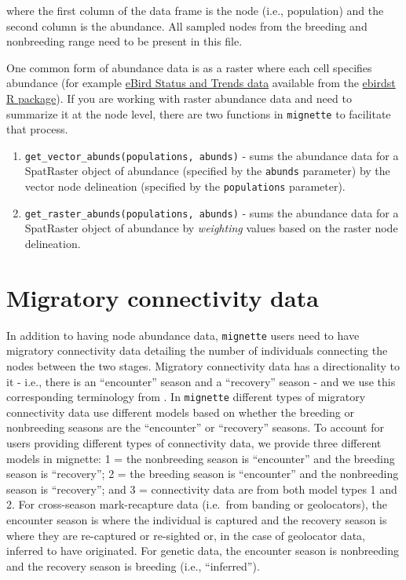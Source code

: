 \documentclass[
]{book}
\begin{document}
where the first column of the data frame is the node (i.e., population) and the second column is the abundance. All sampled nodes from the breeding and nonbreeding range need to be present in this file.

One common form of abundance data is as a raster where each cell specifies abundance (for example \href{https://science.ebird.org/en/status-and-trends}{eBird Status and Trends data} available from the \href{https://cornelllabofornithology.github.io/ebirdst/}{ebirdst R package}). If you are working with raster abundance data and need to summarize it at the node level, there are two functions in \texttt{mignette} to facilitate that process.

\begin{enumerate}
\def\labelenumi{\arabic{enumi}.}
\item
  \texttt{get\_vector\_abunds(populations,\ abunds)} - sums the abundance data for a SpatRaster object of abundance (specified by the \texttt{abunds} parameter) by the vector node delineation (specified by the \texttt{populations} parameter).
\item
  \texttt{get\_raster\_abunds(populations,\ abunds)} - sums the abundance data for a SpatRaster object of abundance by \emph{weighting} values based on the raster node delineation.
\end{enumerate}

\hypertarget{migratory-connectivity-data}{%
\section{Migratory connectivity data}\label{migratory-connectivity-data}}

In addition to having node abundance data, \texttt{mignette} users need to have migratory connectivity data detailing the number of individuals connecting the nodes between the two stages. Migratory connectivity data has a directionality to it - i.e., there is an ``encounter'' season and a ``recovery'' season - and we use this corresponding terminology from \citep{prochazka2017delineating}. In \texttt{mignette} different types of migratory connectivity data use different models based on whether the breeding or nonbreeding seasons are the ``encounter'' or ``recovery'' seasons. To account for users providing different types of connectivity data, we provide three different models in mignette: 1 = the nonbreeding season is ``encounter'' and the breeding season is ``recovery''; 2 = the breeding season is ``encounter'' and the nonbreeding season is ``recovery''; and 3 = connectivity data are from both model types 1 and 2. For cross-season mark-recapture data (i.e.~from banding or geolocators), the encounter season is where the individual is captured and the recovery season is where they are re-captured or re-sighted or, in the case of geolocator data, inferred to have originated. For genetic data, the encounter season is nonbreeding and the recovery season is breeding (i.e., ``inferred'').
\end{document}
